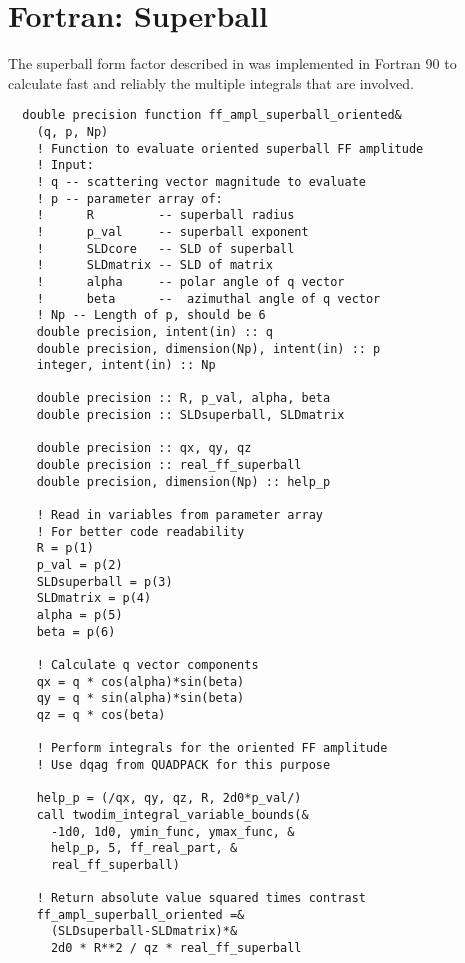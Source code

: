 \documentclass[\main/dresen_thesis.tex]{subfiles}
\begin{document}
\section{Fortran: Superball}\label{ch:appendix:code:superball}
The superball form factor described in  was implemented in Fortran 90 to calculate fast and reliably the multiple integrals that are involved.

\begin{lstlisting}
  double precision function ff_ampl_superball_oriented&
    (q, p, Np)
    ! Function to evaluate oriented superball FF amplitude
    ! Input:
    ! q -- scattering vector magnitude to evaluate
    ! p -- parameter array of:
    !      R         -- superball radius
    !      p_val     -- superball exponent
    !      SLDcore   -- SLD of superball
    !      SLDmatrix -- SLD of matrix
    !      alpha     -- polar angle of q vector
    !      beta      --  azimuthal angle of q vector
    ! Np -- Length of p, should be 6
    double precision, intent(in) :: q
    double precision, dimension(Np), intent(in) :: p
    integer, intent(in) :: Np

    double precision :: R, p_val, alpha, beta
    double precision :: SLDsuperball, SLDmatrix

    double precision :: qx, qy, qz
    double precision :: real_ff_superball
    double precision, dimension(Np) :: help_p

    ! Read in variables from parameter array
    ! For better code readability
    R = p(1)
    p_val = p(2)
    SLDsuperball = p(3)
    SLDmatrix = p(4)
    alpha = p(5)
    beta = p(6)

    ! Calculate q vector components
    qx = q * cos(alpha)*sin(beta)
    qy = q * sin(alpha)*sin(beta)
    qz = q * cos(beta)

    ! Perform integrals for the oriented FF amplitude
    ! Use dqag from QUADPACK for this purpose

    help_p = (/qx, qy, qz, R, 2d0*p_val/)
    call twodim_integral_variable_bounds(&
      -1d0, 1d0, ymin_func, ymax_func, &
      help_p, 5, ff_real_part, &
      real_ff_superball)

    ! Return absolute value squared times contrast
    ff_ampl_superball_oriented =&
      (SLDsuperball-SLDmatrix)*&
      2d0 * R**2 / qz * real_ff_superball


\end{lstlisting}
\end{document}
